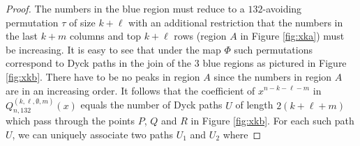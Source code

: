 \documentclass[
final,nomarks
]{dmtcs-episciences}
\newcommand{\fref}[1]{Figure \ref{fig:#1}}
\newcommand{\Qmmn}[2]{Q_{#2,132}^{(#1)}(x)}
\begin{document}
\begin{proof}
The numbers in the blue region must reduce to a \begin{math}132\end{math}-avoiding permutation \begin{math}\tau\end{math} of size \begin{math}k+\ell\end{math} with an additional restriction that the numbers in the last \begin{math}k+m\end{math} columns and top \begin{math}k+\ell\end{math} rows (region \begin{math}A\end{math} in \fref{xka}) must be increasing. It is easy to see that under the map \begin{math}\Phi\end{math} such permutations correspond to  Dyck paths in the join 
	of the \begin{math}3\end{math} blue regions as pictured in \fref{xkb}. There have to be no peaks in region \begin{math}A\end{math} since the numbers in region \begin{math}A\end{math} are in an increasing order.
	It follows that 
	the coefficient of \begin{math}x^{n-k-\ell-m}\end{math} in \begin{math}\Qmmn{k,\ell,\emptyset,m}{n}\end{math} equals the number of Dyck paths \begin{math}U\end{math}
	of length \begin{math}2(k+\ell+m)\end{math} which pass through the points \begin{math}P\end{math}, \begin{math}Q\end{math} and \begin{math}R\end{math} in \fref{xkb}. 
	For each such path \begin{math}U\end{math}, we can uniquely associate two paths \begin{math}U_1\end{math} and \begin{math}U_2\end{math} where 

\end{proof}
\end{document}
